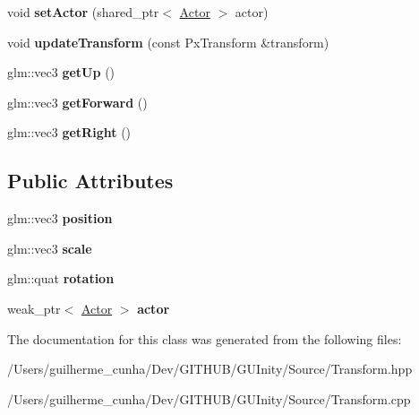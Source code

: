 \begin{DoxyCompactItemize}
\item 
\hypertarget{class_transform_a91ebc858d4204124c0ce442793c7f6d6}{}void {\bfseries set\+Actor} (shared\+\_\+ptr$<$ \hyperlink{class_actor}{Actor} $>$ actor)\label{class_transform_a91ebc858d4204124c0ce442793c7f6d6}

\item 
\hypertarget{class_transform_a8c280984ad3fc48ab1c675005981eb9d}{}void {\bfseries update\+Transform} (const Px\+Transform \&transform)\label{class_transform_a8c280984ad3fc48ab1c675005981eb9d}

\item 
\hypertarget{class_transform_ae2a250d5b040fb15861b331d616256d9}{}glm\+::vec3 {\bfseries get\+Up} ()\label{class_transform_ae2a250d5b040fb15861b331d616256d9}

\item 
\hypertarget{class_transform_a6d09ac46dac939a49cabcd2b285d249a}{}glm\+::vec3 {\bfseries get\+Forward} ()\label{class_transform_a6d09ac46dac939a49cabcd2b285d249a}

\item 
\hypertarget{class_transform_ababc19a8be06175b7ad0d2d9a30328fc}{}glm\+::vec3 {\bfseries get\+Right} ()\label{class_transform_ababc19a8be06175b7ad0d2d9a30328fc}

\end{DoxyCompactItemize}
\subsection*{Public Attributes}
\begin{DoxyCompactItemize}
\item 
\hypertarget{class_transform_aa357f8eb780f4ef195027d1c636baa36}{}glm\+::vec3 {\bfseries position}\label{class_transform_aa357f8eb780f4ef195027d1c636baa36}

\item 
\hypertarget{class_transform_acf6ab53778448fd2f2d8a367c14e7f95}{}glm\+::vec3 {\bfseries scale}\label{class_transform_acf6ab53778448fd2f2d8a367c14e7f95}

\item 
\hypertarget{class_transform_a04e5b17a17093c5eb72e70e392addaec}{}glm\+::quat {\bfseries rotation}\label{class_transform_a04e5b17a17093c5eb72e70e392addaec}

\item 
\hypertarget{class_transform_af3fbef70f746591953519fa15417b594}{}weak\+\_\+ptr$<$ \hyperlink{class_actor}{Actor} $>$ {\bfseries actor}\label{class_transform_af3fbef70f746591953519fa15417b594}

\end{DoxyCompactItemize}


The documentation for this class was generated from the following files\+:\begin{DoxyCompactItemize}
\item 
/\+Users/guilherme\+\_\+cunha/\+Dev/\+G\+I\+T\+H\+U\+B/\+G\+U\+Inity/\+Source/Transform.\+hpp\item 
/\+Users/guilherme\+\_\+cunha/\+Dev/\+G\+I\+T\+H\+U\+B/\+G\+U\+Inity/\+Source/Transform.\+cpp\end{DoxyCompactItemize}
